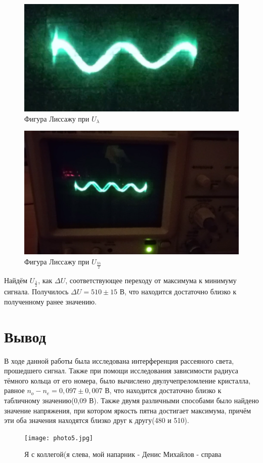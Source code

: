 \documentclass[a4paper,12pt]{article}
\begin{document}
\begin{figure}[H]
	\centering
	\includegraphics[scale=0.5]{photo3.png}
	\caption{Фигура Лиссажу при $U_{\lambda}$}
\end{figure}

\begin{figure}[H]
	\centering
	\includegraphics[scale=0.5]{photo4.png}
	\caption{Фигура Лиссажу при $U_{\frac{3\lambda}{2}}$}
\end{figure}

Найдём $U_{\frac{\lambda}{2}}$, как $\Delta U$, соответствующее переходу от максимума к минимуму сигнала. Получилось $\Delta U = 510 \pm 15$ В, что находится достаточно близко к полученному ранее значению.

\section{Вывод}
В ходе данной работы была исследована интерференция рассеяного света, прошедшего сигнал. Также при помощи исследования зависимости радиуса тёмного кольца от его номера, было вычислено двулучепреломление кристалла, равное $n_o - n_e = 0,097 \pm 0,007$ В, что находится достаточно близко к табличному значению(0,09 В). Также двумя различными способами было найдено значение напряжения, при котором яркость пятна достигает максимума, причём эти оба значения находятся близко друг к другу(480 и 510).

\begin{figure}
\centering
\texttt{[image: photo5.jpg]}
\caption{Я с коллегой(я слева, мой напарник - Денис Михайлов - справа}
\end{figure}
\end{document}
